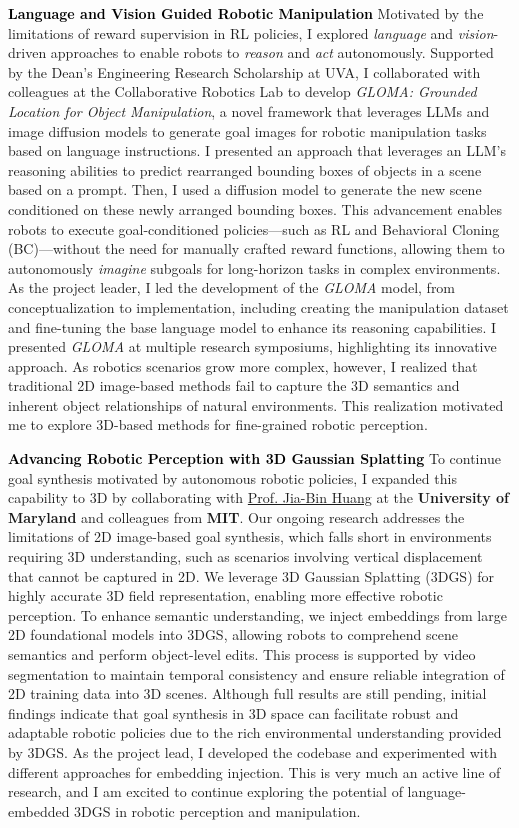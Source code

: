 \documentclass[10pt]{article}
\newcommand{\statement}[1]{\medskip\noindent
  \textcolor{black}{\textbf{#1}}\space
}
\begin{document}
\statement{Language and Vision Guided Robotic Manipulation} Motivated by the limitations of reward supervision in RL policies, I explored \textit{language} and \textit{vision}-driven approaches to enable robots to \textit{reason} and \textit{act} autonomously. Supported by the Dean's Engineering Research Scholarship at UVA, I collaborated with colleagues at the Collaborative Robotics Lab to develop \textit{GLOMA: Grounded Location for Object Manipulation}, a novel framework that leverages LLMs and image diffusion models to generate goal images for robotic manipulation tasks based on language instructions. I presented an approach that leverages an LLM's reasoning abilities to predict rearranged bounding boxes of objects in a scene based on a prompt. Then, I used a diffusion model to generate the new scene conditioned on these newly arranged bounding boxes. This advancement enables robots to execute goal-conditioned policies—such as RL and Behavioral Cloning (BC)—without the need for manually crafted reward functions, allowing them to autonomously \textit{imagine} subgoals for long-horizon tasks in complex environments. As the project leader, I led the development of the \textit{GLOMA} model, from conceptualization to implementation, including creating the manipulation dataset and fine-tuning the base language model to enhance its reasoning capabilities. I presented \textit{GLOMA} at multiple research symposiums, highlighting its innovative approach. As robotics scenarios grow more complex, however, I realized that traditional 2D image-based methods fail to capture the 3D semantics and inherent object relationships of natural environments. This realization motivated me to explore 3D-based methods for fine-grained robotic perception.

\statement{Advancing Robotic Perception with 3D Gaussian Splatting} To continue goal synthesis motivated by autonomous robotic policies, I expanded this capability to 3D by collaborating with \href{https://jbhuang0604.github.io/}{Prof. Jia-Bin Huang} at the \textbf{University of Maryland} and colleagues from \textbf{MIT}. Our ongoing research addresses the limitations of 2D image-based goal synthesis, which falls short in environments requiring 3D understanding, such as scenarios involving vertical displacement that cannot be captured in 2D. We leverage 3D Gaussian Splatting (3DGS) for highly accurate 3D field representation, enabling more effective robotic perception. To enhance semantic understanding, we inject embeddings from large 2D foundational models into 3DGS, allowing robots to comprehend scene semantics and perform object-level edits. This process is supported by video segmentation to maintain temporal consistency and ensure reliable integration of 2D training data into 3D scenes. Although full results are still pending, initial findings indicate that goal synthesis in 3D space can facilitate robust and adaptable robotic policies due to the rich environmental understanding provided by 3DGS. As the project lead, I developed the codebase and experimented with different approaches for embedding injection. This is very much an active line of research, and I am excited to continue exploring the potential of language-embedded 3DGS in robotic perception and manipulation.
\end{document}
